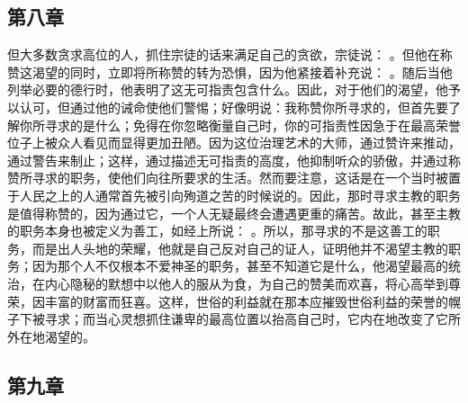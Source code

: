 
\subsection{第八章}

\par

但大多数贪求高位的人，抓住宗徒的话来满足自己的贪欲，宗徒说： 。但他在称赞这渴望的同时，立即将所称赞的转为恐惧，因为他紧接着补充说： 。随后当他列举必要的德行时，他表明了这无可指责包含什么。因此，对于他们的渴望，他予以认可，但通过他的诫命使他们警惕；好像明说：我称赞你所寻求的，但首先要了解你所寻求的是什么；免得在你忽略衡量自己时，你的可指责性因急于在最高荣誉位子上被众人看见而显得更加丑陋。因为这位治理艺术的大师，通过赞许来推动，通过警告来制止；这样，通过描述无可指责的高度，他抑制听众的骄傲，并通过称赞所寻求的职务，使他们向往所要求的生活。然而要注意，这话是在一个当时被置于人民之上的人通常首先被引向殉道之苦的时候说的。因此，那时寻求主教的职务是值得称赞的，因为通过它，一个人无疑最终会遭遇更重的痛苦。故此，甚至主教的职务本身也被定义为善工，如经上所说： 。所以，那寻求的不是这善工的职务，而是出人头地的荣耀，他就是自己反对自己的证人，证明他并不渴望主教的职务；因为那个人不仅根本不爱神圣的职务，甚至不知道它是什么，他渴望最高的统治，在内心隐秘的默想中以他人的服从为食，为自己的赞美而欢喜，将心高举到尊荣，因丰富的财富而狂喜。这样，世俗的利益就在那本应摧毁世俗利益的荣誉的幌子下被寻求；而当心灵想抓住谦卑的最高位置以抬高自己时，它内在地改变了它所外在地渴望的。\par


\subsection{第九章}

\par

